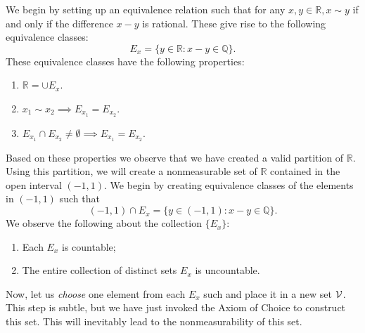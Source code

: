 \documentclass{article}
\theoremstyle{axiom} \newtheorem{axiom}{Axiom}
\theoremstyle{definition} \newtheorem{definition}{Definition}
\theoremstyle{example} \newtheorem{example}{Example}
\theoremstyle{proposition} \newtheorem{prop}{Proposition}
\theoremstyle{lemma} \newtheorem{lemma}{Lemma}
\newcommand{\Q}{\mathbb{Q}}  \newcommand{\R}{\mathbb{R}}
\begin{document}
We begin by setting up an equivalence relation such that for any  $x,y \in \R, 
x \sim y$ if and only if the difference $x-y$ is rational. These give rise to 
the following equivalence classes:
\begin{equation*}
	E_{x} = \{ y \in \R : x-y \in \Q \}.
\end{equation*}
These equivalence classes have the following properties:
\begin{enumerate}
	\item $\R = \cup E_{x}$.
	\item $x_1 \sim x_2 \implies E_{x_1} = E_{x_2}$.
	\item $E_{x_1} \cap E_{x_2} \neq \emptyset \implies E_{x_1} = E_{x_2}$.
\end{enumerate}
Based on these properties we observe that we have created a valid partition of 
$\R$. Using this partition, we will create a nonmeasurable set of $\R$ contained in
the open interval $(-1,1)$. We begin by creating equivalence classes of the 
elements in $(-1,1)$ such that
\begin{equation*}
	(-1,1) \cap E_x = \{ y \in (-1,1) : x-y \in \Q \}.
\end{equation*}
We observe the following about the collection $\{E_x\}$:
\begin{enumerate}
	\item Each $E_x$ is countable;
	\item The entire collection of distinct sets $E_x$ is uncountable.
\end{enumerate}
Now, let us \textit{choose} one element from each $E_x$ such and place it in a new 
set $\mathcal{V}$. This step is subtle, but we have just invoked the Axiom of Choice to 
construct this set. This will inevitably  lead to the nonmeasurability of this set.
\end{document}
